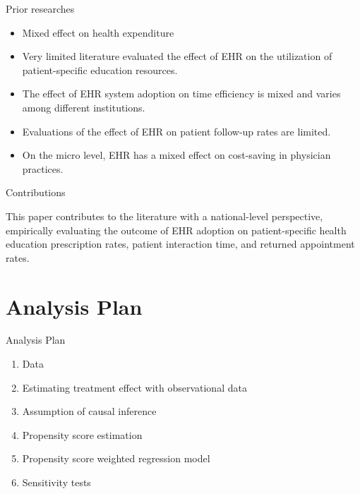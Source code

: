 \documentclass[10pt, compress]{beamer}
\begin{document}
\begin{frame}{Prior researches}

     
      \begin{itemize}
        \item Mixed effect on health expenditure 
        \item Very limited literature evaluated the effect of EHR on the utilization of patient-specific education resources. 
        \item The effect of EHR system adoption on time efficiency is mixed and varies among different institutions.
        \item Evaluations of the effect of EHR on patient follow-up rates are limited.
        \item On the micro level, EHR has a mixed effect on cost-saving in physician practices.
      \end{itemize}

\end{frame}

\begin{frame}{Contributions}

     
This paper contributes to the literature with a national-level perspective, empirically evaluating the outcome of EHR adoption on patient-specific health education prescription rates, patient interaction time, and returned appointment rates. 


\end{frame}

\section{Analysis Plan}


\begin{frame}{Analysis Plan}

     
      \begin{enumerate}
        \item Data 
        \item Estimating treatment effect with observational data 
        \item Assumption of causal inference
        \item Propensity score estimation
        \item Propensity score weighted regression model
        \item Sensitivity tests
      \end{enumerate}
\end{frame}
\end{document}

